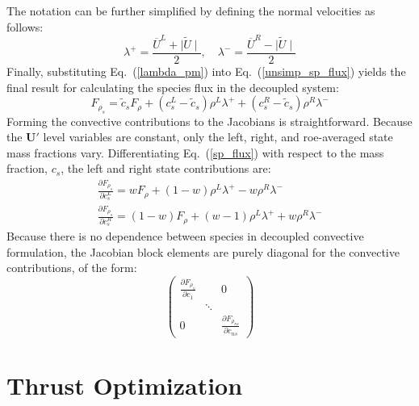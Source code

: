 \documentclass{article}   	%
\begin{document}
%
The notation can be further simplified by defining the normal velocities as follows:
%
\begin{equation}
\label{lambda_pm}
	\lambda^+ = \frac{\overline{U}^L+\mid \tilde{U}\mid}{2}, \quad 
	\lambda^- = \frac{\overline{U}^R-\mid \tilde{U}\mid}{2}
\end{equation}
%
Finally, substituting Eq.~(\ref{lambda_pm}) into Eq.~(\ref{unsimp_sp_flux}) yields the final result for calculating the species flux in the decoupled system:
%
\begin{equation}
\label{sp_flux}
	F_{\rho_s} =\tilde{c}_s F_\rho + (c_s^L-\tilde{c}_s)\rho^L\lambda^+
	+ (c_s^R-\tilde{c}_s)\rho^R\lambda^-
\end{equation}
%
Forming the convective contributions to the Jacobians is straightforward.   Because the $\mathbf{U}'$ level variables are constant, only the left, right, and roe-averaged state mass fractions vary.  Differentiating Eq.~(\ref{sp_flux}) with respect to the mass fraction, $c_s$, the left and right state contributions are:
%
\begin{gather}
	\frac{\partial F_{\rho_s}}{\partial c^L_s} = wF_\rho+(1-w)\rho^L\lambda^+ - w\rho^R\lambda^- \\
	\frac{\partial F_{\rho_s}}{\partial c^R_s} = (1-w)F_\rho+(w-1)\rho^L\lambda^+ + w\rho^R\lambda^-
\end{gather}
%
Because there is no dependence between species in decoupled convective formulation, the Jacobian block elements are purely diagonal for the convective contributions, of the form:
%
\begin{equation}
	\begin{pmatrix}
		\frac{\partial F_{\rho_1}}{\partial c_1} & & 0 \\
		 & \ddots &  \\
		 0 & & \frac{\partial F_{\rho_{ns}}}{\partial c_{ns}}
	\end{pmatrix}
\end{equation}

\section{Thrust Optimization}
\end{document}
